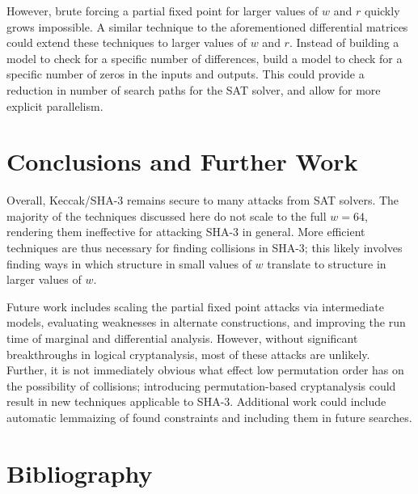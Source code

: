 \documentclass[10pt,twocolumn,twoside]{pnas-new}
\begin{document}
However, brute forcing a partial fixed point for larger values of $w$ and $r$
quickly grows impossible. A similar technique to the aforementioned
differential matrices could extend these techniques to larger values of $w$
and $r$. Instead of building a model to check for a specific number of
differences, build a model to check for a specific number of zeros in
the inputs and outputs. This could provide a reduction in number of search
paths for the SAT solver, and allow for more explicit parallelism.



\section{Conclusions and Further Work} \label{sec:conclusion}

Overall, Keccak/SHA-3 remains secure to many attacks from SAT solvers. The
majority of the techniques discussed here do not scale to the full $w=64$,
rendering them ineffective for attacking SHA-3 in general. More efficient
techniques are thus necessary for finding collisions in SHA-3; this likely
involves finding ways in which structure in small values of $w$ translate to
structure in larger values of $w$.

Future work includes scaling the partial fixed point attacks via intermediate
models, evaluating weaknesses in alternate constructions, and improving
the run time of marginal and differential analysis. However, without
significant breakthroughs in logical cryptanalysis, most of these attacks are
unlikely. Further, it is not immediately obvious what effect low permutation
order has on the possibility of collisions; introducing permutation-based
cryptanalysis could result in new techniques applicable to SHA-3. Additional
work could include automatic lemmaizing of found constraints and including
them in future searches.


\section{Bibliography} \label{sec:bibliography}


\end{document}
